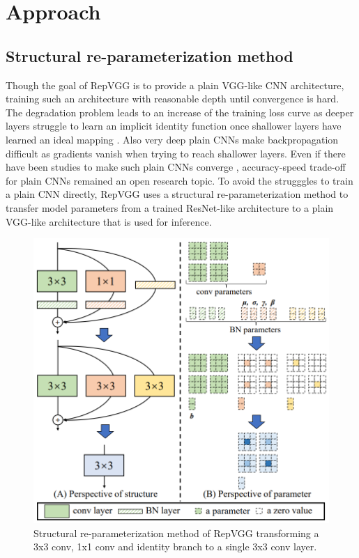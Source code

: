 \section{Approach}

\subsection{Structural re-parameterization method}

Though the goal of RepVGG is to provide a plain VGG-like CNN architecture, training such an architecture with reasonable depth until convergence is hard. The degradation problem leads to an increase of the training loss curve as deeper layers struggle to learn an implicit identity function once shallower layers have learned an ideal mapping \cite{KaimingHe.2015}. Also very deep plain CNNs make backpropagation difficult as gradients vanish when trying to reach shallower layers. Even if there have been studies to make such plain CNNs converge \cite{LechaoXiao.2018, OyebadeKOyedotun.2020}, accuracy-speed trade-off for plain CNNs remained an open research topic. To avoid the strugggles to train a plain CNN directly, RepVGG uses a structural re-parameterization method to transfer model parameters from a trained ResNet-like architecture to a plain VGG-like architecture that is used for inference. 

\begin{figure}[t]
	\begin{center}
		\includegraphics[width=0.8\linewidth]{images/re-parameterization.PNG}
	\end{center}
	\caption{Structural re-parameterization method of RepVGG transforming a 3x3 conv, 1x1 conv and identity branch to a single 3x3 conv layer.}
	\label{fig:reparameterization}
\end{figure}

